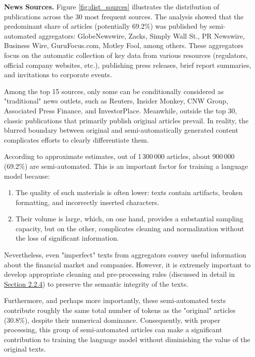 \textbf{News Sources.} Figure \ref{fig:dist_sources} illustrates the distribution of publications across the 30 most frequent sources.
The analysis showed that the predominant share of articles (potentially 69.2\%) was published by semi-automated aggregators:
GlobeNewswire, Zacks, Simply Wall St., PR Newswire, Business Wire, GuruFocus.com, Motley Fool, among others. These aggregators focus
on the automatic collection of key data from various resources (regulators, official company websites, etc.), publishing press releases,
brief report summaries, and invitations to corporate events.

Among the top 15 sources, only some can be conditionally considered as "traditional" news outlets, such as Reuters, Insider Monkey,
CNW Group, Associated Press Finance, and InvestorPlace. Meanwhile, outside the top 30, classic publications that primarily publish
original articles prevail. In reality, the blurred boundary between original and semi-automatically generated content complicates
efforts to clearly differentiate them.

According to approximate estimates, out of 1\,300\,000 articles, about 900\,000 (69.2\%) are semi-automated. This is an important factor
for training a language model because:

\begin{enumerate}
    \item The quality of such materials is often lower: texts contain artifacts, broken formatting, and incorrectly inserted characters.
    \item Their volume is large, which, on one hand, provides a substantial sampling capacity, but on the other, complicates cleaning and normalization without the loss of significant information.
\end{enumerate}

Nevertheless, even "imperfect" texts from aggregators convey useful information about the financial market and companies. However,
it is extremely important to develop appropriate cleaning and pre-processing rules (discussed in detail in \hyperref[sec:data_prep]{Section 2.2.4})
to preserve the semantic integrity of the texts.

Furthermore, and perhaps more importantly, these semi-automated texts contribute roughly the same total number of tokens
as the "original" articles (30.8\%), despite their numerical dominance. Consequently, with proper processing, this group of semi-automated
articles can make a significant contribution to training the language model without diminishing the value of the original texts.

